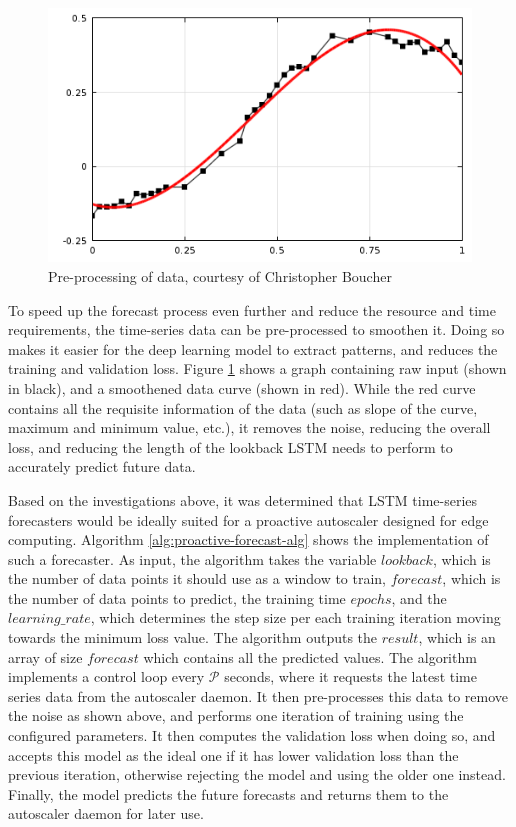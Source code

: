 \begin{figure}[htb]
    \centering
    \caption{Pre-processing of data, courtesy of Christopher Boucher \cite{comsolcurvefitting}}
    \label{fig:data-pre-process}
    \includegraphics[width=0.6\linewidth]{Figures/Data-Pre-Processing.png}
\end{figure}

To speed up the forecast process even further and reduce the resource and time requirements, the time-series data can be pre-processed to smoothen it. Doing so makes it easier for the deep learning model to extract patterns, and reduces the training and validation loss. Figure \ref{fig:data-pre-process} shows a graph containing raw input (shown in black), and a smoothened data curve (shown in red). While the red curve contains all the requisite information of the data (such as slope of the curve, maximum and minimum value, etc.), it removes the noise, reducing the overall loss, and reducing the length of the lookback LSTM needs to perform to accurately predict future data.\par

Based on the investigations above, it was determined that LSTM time-series forecasters would be ideally suited for a proactive autoscaler designed for edge computing. Algorithm \ref{alg:proactive-forecast-alg} shows the implementation of such a forecaster. As input, the algorithm takes the variable $lookback$, which is the number of data points it should use as a window to train, $forecast$, which is the number of data points to predict, the training time $epochs$, and the $learning\_rate$, which determines the step size per each training iteration moving towards the minimum loss value. The algorithm outputs the $result$, which is an array of size $forecast$ which contains all the predicted values. The algorithm implements a control loop every $\mathcal{P}$ seconds, where it requests the latest time series data from the autoscaler daemon. It then pre-processes this data to remove the noise as shown above, and performs one iteration of training using the configured parameters. It then computes the validation loss when doing so, and accepts this model as the ideal one if it has lower validation loss than the previous iteration, otherwise rejecting the model and using the older one instead. Finally, the model predicts the future forecasts and returns them to the autoscaler daemon for later use.\par


